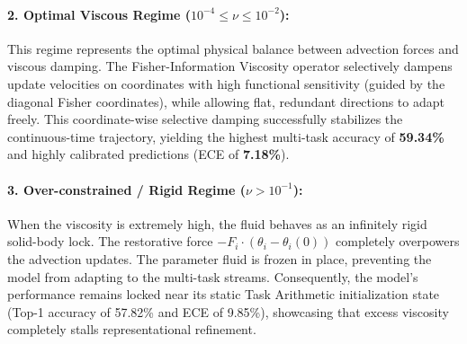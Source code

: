 \documentclass{article}
\theoremstyle{plain}
\theoremstyle{definition}
\theoremstyle{remark}
\begin{document}
\paragraph{2. Optimal Viscous Regime ($10^{-4} \le \nu \le 10^{-2}$):}
This regime represents the optimal physical balance between advection forces and viscous damping. The Fisher-Information Viscosity operator selectively dampens update velocities on coordinates with high functional sensitivity (guided by the diagonal Fisher coordinates), while allowing flat, redundant directions to adapt freely. This coordinate-wise selective damping successfully stabilizes the continuous-time trajectory, yielding the highest multi-task accuracy of \textbf{59.34\%} and highly calibrated predictions (ECE of \textbf{7.18\%}).

\paragraph{3. Over-constrained / Rigid Regime ($\nu > 10^{-1}$):}
When the viscosity is extremely high, the fluid behaves as an infinitely rigid solid-body lock. The restorative force $-F_i \cdot \left(\theta_i - \theta_i(0)\right)$ completely overpowers the advection updates. The parameter fluid is frozen in place, preventing the model from adapting to the multi-task streams. Consequently, the model's performance remains locked near its static Task Arithmetic initialization state (Top-1 accuracy of 57.82\% and ECE of 9.85\%), showcasing that excess viscosity completely stalls representational refinement.
\end{document}
